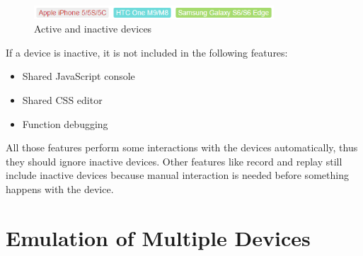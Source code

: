 \begin{figure}[H]
  \centering
    \includegraphics[width=0.8\textwidth]{images/screenshots/active_inactive.png}
	\caption[Screenshot: Active/inactive devices]{Active and inactive devices}
	\label{fig:active_inactive}
\end{figure}

If a device is inactive, it is not included in the following features:
\begin{itemize}
	\item Shared JavaScript console
	\item Shared CSS editor
	\item Function debugging
\end{itemize}
All those features perform some interactions with the devices automatically, thus they should ignore inactive devices. Other features like record and replay still include inactive devices because manual interaction is needed before something happens with the device. 

\section{Emulation of Multiple Devices}

